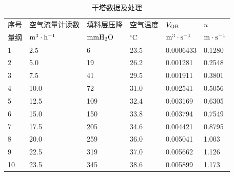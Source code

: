 \documentclass[UTF8,AutoFakeBold,a4paper]{article}
\begin{document}
\setcounter{table}{0}
\begin{table}[h]
\caption{干塔数据及处理}
		\centering
		\begin{tabular}{p{3cm}<{\centering} p{3cm}<{\centering} p{3cm}<{\centering} p{3cm}<{\centering} p{3cm}<{\centering} p{3cm}<{\centering}}
		\toprule
		
   序号 & 空气流量计读数 & 填料层压降 & 空气温度 & $V_{\rm{OB}}$ & $u$ \\ 

  量纲&$\rm{m}^{3}\cdot\rm{h}^{-1}$&$\rm{mm}\ce{H2O}$&$^\circ$C&$\rm{m}^{3}\cdot\rm{s}^{-1}$&$\rm{m}\cdot\rm{s}^{-1}$\\
 \midrule
             1 & 2.5 & 6 & 23.5 & 0.0006433 & 0.1280 \\ 
        2 & 5.0 & 19 & 26.2 & 0.001281 & 0.2548 \\ 
        3 & 7.5 & 41 & 29.5 & 0.001911 & 0.3801 \\ 
        4 & 10.0 & 72 & 31.0 & 0.002541 & 0.5056 \\ 
        5 & 12.5 & 109 & 32.4 & 0.003169 & 0.6305 \\ 
        6 & 15.0 & 150 & 33.8 & 0.003794 & 0.7549 \\ 
        7 & 17.5 & 205 & 34.6 & 0.004421 & 0.8795 \\ 
        8 & 20.0 & 259 & 36.0 & 0.005041 & 1.003 \\ 
        9 & 22.5 & 319 & 37.0 & 0.005662 & 1.126 \\ 
        10 & 23.5 & 345 & 38.6 & 0.005899 & 1.173 \\ 		
        \bottomrule
		\end{tabular}	
		\label{ta1}
		
\end{table}
\end{document}
